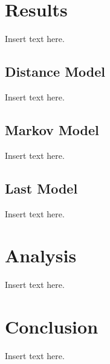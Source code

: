 \documentclass[twoside,twocolumn]{article}
\begin{document}
\section{Results}
\label{sec:res}
Insert text here.

\subsection{Distance Model}
Insert text here.

\subsection{Markov Model}
Insert text here.

\subsection{Last Model}
Insert text here.

\section{Analysis}
\label{sec:analysis}
Insert text here.

\section{Conclusion}
\label{sec:conclusion}
Insert text here.

\end{document}
